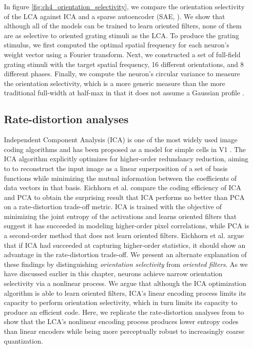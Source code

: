In figure \ref{fig:ch4_orientation_selectivity}, we compare the orientation selectivity of the LCA against ICA and a sparse autoencoder (SAE, \cite{ng2011sparse}).
We show that although all of the models can be trained to learn oriented filters, none of them are as selective to oriented grating stimuli as the LCA.
To produce the grating stimulus, we first computed the optimal spatial frequency for each neuron's weight vector using a Fourier transform.
Next, we constructed a set of full-field grating stimuli with the target spatial frequency, 16 different orientations, and 8 different phases.
Finally, we compute the neuron's circular variance to measure the orientation selectivity, which is a more generic measure than the more traditional full-width at half-max in that it does not assume a Gaussian profile \parencite{ringach2002orientation}.

\subsection{Rate-distortion analyses}
Independent Component Analysis (ICA) is one of the most widely used image coding algorithms and has been proposed as a model for simple cells in V1 \parencite{bell1997independent, hyvarinen1999fast}.
The ICA algorithm explicitly optimizes for higher-order redundancy reduction, aiming to to reconstruct the input image as a linear superposition of a set of basis functions while minimizing the mutual information between the coefficients of data vectors in that basis.
Eichhorn et al. \citeyearpar{eichhorn2009natural} compare the coding efficiency of ICA and PCA to obtain the surprising result that ICA performs no better than PCA on a rate-distortion trade-off metric.
ICA is trained with the objective of minimizing the joint entropy of the activations and learns oriented filters that suggest it has succeeded in modeling higher-order pixel correlations, while PCA is a second-order method that does not learn oriented filters.
Eichhorn et al. \citeyearpar{eichhorn2009natural} argue that if ICA had succeeded at capturing higher-order statistics, it should show an advantage in the rate-distortion trade-off.
We present an alternate explanation of these findings by distinguishing \textit{orientation selectivity} from \textit{oriented filters}.
As we have discussed earlier in this chapter, neurons achieve narrow orientation selectivity via a nonlinear process.
We argue that although the ICA optimization algorithm is able to learn oriented filters, ICA's linear encoding process limits its capacity to perform orientation selectivity, which in turn limits its capacity to produce an efficient code.
Here, we replicate the rate-distortion analyses from \parencite{eichhorn2009natural} to show that the LCA's nonlinear encoding process produces lower entropy codes than linear encoders while being more perceptually robust to increasingly coarse quantization.

